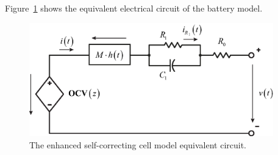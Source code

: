 \documentclass[11pt,a4paper,oneside]{book}
\numberwithin{equation}{section}
\theoremstyle{it}
\theoremstyle{definition}
\begin{document}
\begin{mybox}
\begin{multicols}{3}
	\end{multicols}
	Figure~\ref{equivalent_circuit_battery} shows the equivalent electrical circuit of the battery model.
	\begin{figure}[H]
		\centering
		\includegraphics[width = 300pt, angle = 0, 
		keepaspectratio]{figures/lithium_ion_battery/cell_eq_circuit_5.eps}
		\captionsetup{width=0.5\textwidth, font=small}		
		\caption{The enhanced self-correcting cell model equivalent circuit.}
		\label{equivalent_circuit_battery}
	\end{figure}
\end{mybox}
\end{document}
